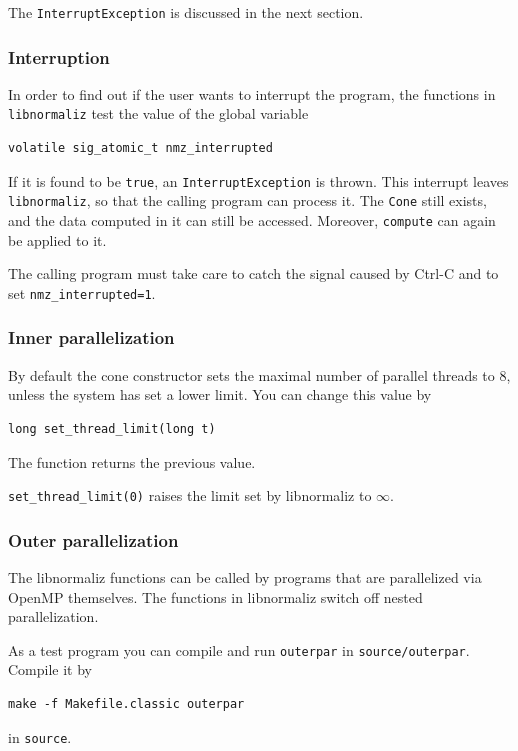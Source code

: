 \begin{small}
The \verb|InterruptException| is discussed in the next section.

\subsubsection{Interruption}

In order to find out if the user wants to interrupt the program, the functions in \verb|libnormaliz| test the value of the global variable
\begin{Verbatim}
volatile sig_atomic_t nmz_interrupted
\end{Verbatim}
If it is found to be \verb|true|, an \verb|InterruptException| is thrown. This interrupt leaves \verb|libnormaliz|, so that the calling program can process it. The \verb|Cone| still exists, and the data computed in it can still be accessed. Moreover, \verb|compute| can again be applied to it.

The calling program must take care to catch the signal caused by Ctrl-C and to set \verb|nmz_interrupted=1|.

\subsubsection{Inner parallelization}

By default the cone constructor sets the maximal number of parallel threads to $8$, unless the system has set a lower limit. You can change this value by
\begin{Verbatim}
long set_thread_limit(long t)
\end{Verbatim}
The function returns the previous value.

\verb|set_thread_limit(0)| raises the limit set by libnormaliz to $\infty$.

\subsubsection{Outer parallelization}

The libnormaliz functions can be called by programs that are parallelized via OpenMP themselves. The functions in libnormaliz switch off nested parallelization.

As a test program you can compile and run \verb|outerpar| in \verb|source/outerpar|. Compile it by
\begin{Verbatim}
make -f Makefile.classic outerpar
\end{Verbatim}
in \verb|source|.


\end{small}

